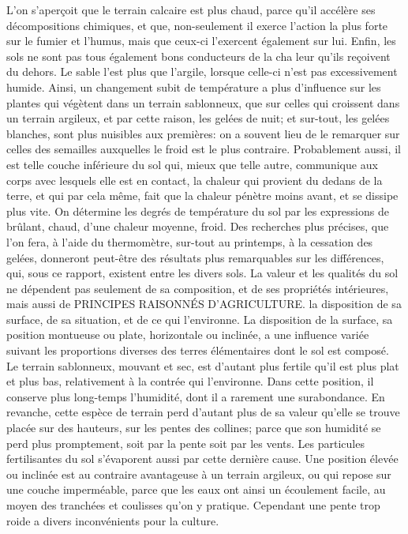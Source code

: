 L'on s'aperçoit que le terrain calcaire est plus chaud, parce qu'il accélère ses décompositions chimiques, et que, non-seulement il exerce l'action la plus forte sur le fumier et l'humus, mais que ceux-ci l'exercent également sur lui. Enfin, les sols ne sont pas tous également bons conducteurs de la cha\setcounter{page}{186} leur qu'ils reçoivent du dehors. Le sable l'est plus que l'argile, lorsque celle-ci n'est pas excessivement humide. Ainsi, un changement subit de température a plus d'influence sur les plantes qui végètent dans un terrain sablonneux, que sur celles qui croissent dans un terrain argileux, et par cette raison, les gelées de nuit; et sur-tout, les gelées blanches, sont plus nuisibles aux premières: on a souvent lieu de le remarquer sur celles des semailles auxquelles le froid est le plus contraire. Probablement aussi, il est telle couche inférieure du sol qui, mieux que telle autre, communique aux corps avec lesquels elle est en contact, la chaleur qui provient du dedans de la terre, et qui par cela même, fait que la chaleur pénètre moins avant, et se dissipe plus vite.
On détermine les degrés de température du sol par les expressions de brûlant, chaud, d'une chaleur moyenne, froid.
Des recherches plus précises, que l'on fera, à l'aide du thermomètre, sur-tout au printemps, à la cessation des gelées, donneront peut-être des résultats plus remarquables sur les différences, qui, sous ce rapport, existent entre les divers sols.
La valeur et les qualités du sol ne dépendent pas seulement de sa composition, et de ses propriétés intérieures, mais aussi de\setcounter{page}{187} PRINCIPES RAISONNÉS D'AGRICULTURE.
la disposition de sa surface, de sa situation, et de ce qui l'environne.
La disposition de la surface, sa position montueuse ou plate, horizontale ou inclinée, a une influence variée suivant les proportions diverses des terres élémentaires dont le sol est composé.
Le terrain sablonneux, mouvant et sec, est d'autant plus fertile qu'il est plus plat et plus bas, relativement à la contrée qui l'environne. Dans cette position, il conserve plus long-temps l'humidité, dont il a rarement une surabondance. En revanche, cette espèce de terrain perd d'autant plus de sa valeur qu'elle se trouve placée sur des hauteurs, sur les pentes des collines; parce que son humidité se perd plus promptement, soit par la pente soit par les vents. Les particules fertilisantes du sol s'évaporent aussi par cette dernière cause.
Une position élevée ou inclinée est au contraire avantageuse à un terrain argileux, ou qui repose sur une couche imperméable, parce que les eaux ont ainsi un écoulement facile, au moyen des tranchées et coulisses qu'on y pratique. Cependant une pente trop roide a divers inconvénients pour la culture.
